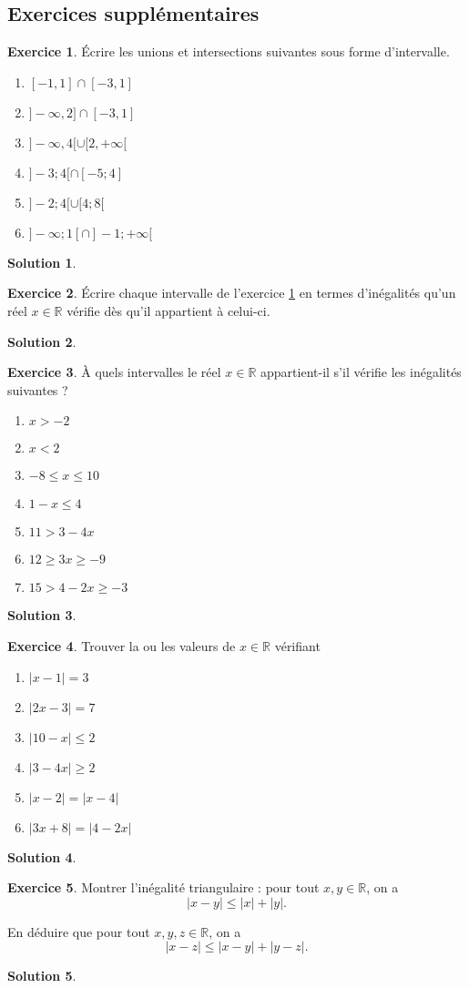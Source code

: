 \documentclass[a4paper, 14pt]{extarticle}
\theoremstyle{plain}
\newtheorem*{sol}{Solution}
\theoremstyle{definition}
\newtheorem{ex}{Exercice}
\newcommand{\R}{\mathbb{R}}
\newcommand{\exe}[2]{
		\begin{ex} #1  \end{ex}
		\begin{sol} #2 \end{sol}
	}
\newcommand{\exe}[2]{
		\begin{ex} #1  \end{ex}
	}
\begin{document}
\newpage
\subsection*{Exercices supplémentaires}

\exe{\label{ex:2}
	Écrire les unions et intersections suivantes sous forme d'intervalle.
	
	
	\begin{multicols}{2}
	\begin{enumerate}
		\item $[-1,1] \cap [-3, 1]$
		\item $]-\infty, 2] \cap [-3, 1]$
		\item $]- \infty, 4 [ \cup [2, +\infty[$
		\item $] -3 ; 4 [ \cap [-5 ; 4]$
		\item $]-2 ; 4 [  \cup [4 ; 8[$
		\item $ ]- \infty ; 1 [ \cap ]-1 ; +\infty [$
	\end{enumerate}
	\end{multicols}
}
{}


\exe{
	Écrire chaque intervalle de l'exercice \ref{ex:2} en termes d'inégalités qu'un réel $x \in \R$ vérifie dès qu'il appartient à celui-ci.
}
{}


\exe{
	À quels intervalles le réel $x \in \R$ appartient-il s'il vérifie les inégalités suivantes ?
	\begin{multicols}{2}
	\begin{enumerate}
		\item $x > -2$
		\item $x  < 2$
		\item $-8 \leq x \leq 10$
		\item $1 - x \leq 4$
		\item $ 11 > 3 - 4x  $
		\item $12 \geq 3x \geq -9$
		\item $15 > 4 - 2x \geq -3$
	\end{enumerate}
	\end{multicols}
}
{}


\exe{
	Trouver la ou les valeurs de $x \in \R$ vérifiant
	\begin{multicols}{2}
	\begin{enumerate}
		\item $|x - 1| = 3$
		\item $|2x-3| = 7$
		\item $|10-x| \leq 2$
		\item $|3 - 4x| \geq 2$
		\item $|x-2| = |x-4|$
		\item $| 3x + 8| = |4 - 2x |$
	\end{enumerate}
	\end{multicols}
}
{}

\exe{
	Montrer l'inégalité triangulaire : pour tout $x,y \in \R$, on a
		\[ |x -  y| \leq |x| + | y|. \]
		
	En déduire que pour tout $x,y,z \in \R$, on a
		\[ |x - z| \leq |x-y| + |y - z|. \]
}
{}
\end{document}
